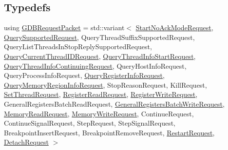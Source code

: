 \subsection*{Typedefs}
\begin{DoxyCompactItemize}
\item 
using \mbox{\hyperlink{namespacexd_1_1dbg_1_1gdbstub_1_1pkt_a65690974f9b6e8807842c637042664a6}{G\+D\+B\+Request\+Packet}} = std\+::variant$<$ \mbox{\hyperlink{classxd_1_1dbg_1_1gdbstub_1_1pkt_1_1_start_no_ack_mode_request}{Start\+No\+Ack\+Mode\+Request}}, \mbox{\hyperlink{classxd_1_1dbg_1_1gdbstub_1_1pkt_1_1_query_supported_request}{Query\+Supported\+Request}}, Query\+Thread\+Suffix\+Supported\+Request, Query\+List\+Threads\+In\+Stop\+Reply\+Supported\+Request, \mbox{\hyperlink{classxd_1_1dbg_1_1gdbstub_1_1pkt_1_1_query_current_thread_i_d_request}{Query\+Current\+Thread\+I\+D\+Request}}, \mbox{\hyperlink{classxd_1_1dbg_1_1gdbstub_1_1pkt_1_1_query_thread_info_start_request}{Query\+Thread\+Info\+Start\+Request}}, \mbox{\hyperlink{classxd_1_1dbg_1_1gdbstub_1_1pkt_1_1_query_thread_info_continuing_request}{Query\+Thread\+Info\+Continuing\+Request}}, Query\+Host\+Info\+Request, Query\+Process\+Info\+Request, \mbox{\hyperlink{classxd_1_1dbg_1_1gdbstub_1_1pkt_1_1_query_register_info_request}{Query\+Register\+Info\+Request}}, \mbox{\hyperlink{classxd_1_1dbg_1_1gdbstub_1_1pkt_1_1_query_memory_region_info_request}{Query\+Memory\+Region\+Info\+Request}}, Stop\+Reason\+Request, Kill\+Request, \mbox{\hyperlink{classxd_1_1dbg_1_1gdbstub_1_1pkt_1_1_set_thread_request}{Set\+Thread\+Request}}, \mbox{\hyperlink{classxd_1_1dbg_1_1gdbstub_1_1pkt_1_1_register_read_request}{Register\+Read\+Request}}, \mbox{\hyperlink{classxd_1_1dbg_1_1gdbstub_1_1pkt_1_1_register_write_request}{Register\+Write\+Request}}, General\+Registers\+Batch\+Read\+Request, \mbox{\hyperlink{classxd_1_1dbg_1_1gdbstub_1_1pkt_1_1_general_registers_batch_write_request}{General\+Registers\+Batch\+Write\+Request}}, \mbox{\hyperlink{classxd_1_1dbg_1_1gdbstub_1_1pkt_1_1_memory_read_request}{Memory\+Read\+Request}}, \mbox{\hyperlink{classxd_1_1dbg_1_1gdbstub_1_1pkt_1_1_memory_write_request}{Memory\+Write\+Request}}, Continue\+Request, Continue\+Signal\+Request, Step\+Request, Step\+Signal\+Request, Breakpoint\+Insert\+Request, Breakpoint\+Remove\+Request, \mbox{\hyperlink{classxd_1_1dbg_1_1gdbstub_1_1pkt_1_1_restart_request}{Restart\+Request}}, \mbox{\hyperlink{classxd_1_1dbg_1_1gdbstub_1_1pkt_1_1_detach_request}{Detach\+Request}} $>$
\end{DoxyCompactItemize}
